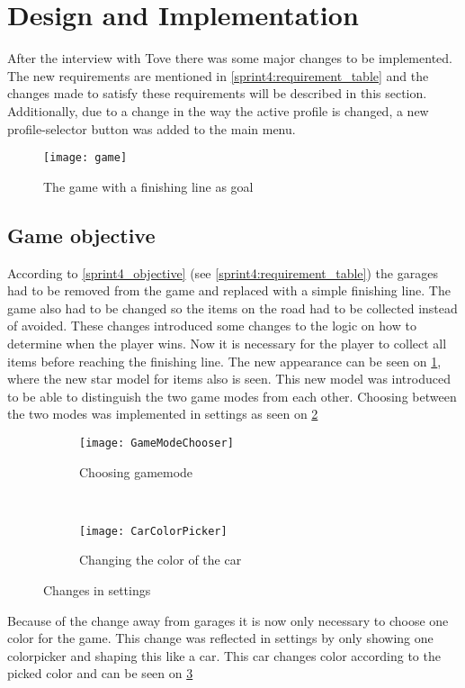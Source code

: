 \section{Design and Implementation}
After the interview with Tove there was some major changes to be implemented.
The new requirements are mentioned in \cref{sprint4:requirement_table} and the changes made to satisfy these requirements will be described in this section.
Additionally, due to a change in the way the active profile is changed, a new profile-selector button was added to the main menu.

\begin{figure}
\texttt{[image: game]}
\caption{The game with a finishing line as goal}
\label{game_with_finishing_line}
\end{figure}

\subsection{Game objective}\label{s4_gameobjective}
According to \cref{sprint4_objective} (see \cref{sprint4:requirement_table}) the garages had to be removed from the game and replaced with a simple finishing line.
The game also had to be changed so the items on the road had to be collected instead of avoided.
These changes introduced some changes to the logic on how to determine when the player wins.
Now it is necessary for the player to collect all items before reaching the finishing line. 
The new appearance can be seen on \cref{game_with_finishing_line}, where the new star model for items also is seen.
This new model was introduced to be able to distinguish the two game modes from each other.
Choosing between the two modes was implemented in settings as seen on \cref{gamemode}


\begin{figure}
\begin{subfigure}{0.5\textwidth}
\centering
\texttt{[image: GameModeChooser]}
\caption{Choosing gamemode}
\label{gamemode}
\end{subfigure}
~
\begin{subfigure}{0.5\textwidth}
\centering
\texttt{[image: CarColorPicker]}
\caption{Changing the color of the car}
\label{carcolor}
\end{subfigure}
\caption{Changes in settings}
\label{Settings}
\end{figure}

Because of the change away from garages it is now only necessary to choose one color for the game. 
This change was reflected in settings by only showing one colorpicker and shaping this like a car.
This car changes color according to the picked color and can be seen on \cref{carcolor}

